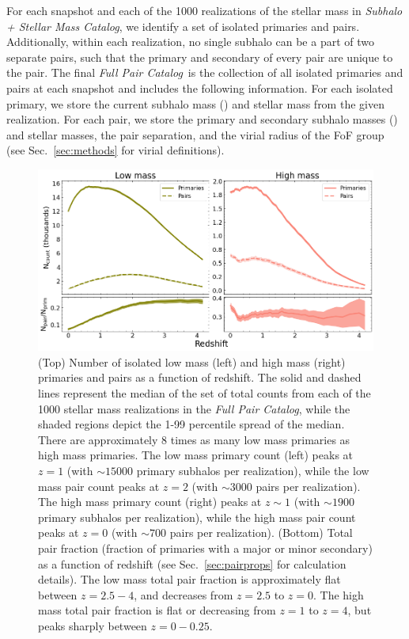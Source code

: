 \documentclass[twocolumn]{aastex631}
\newcommand{\starcat}{\textit{Subhalo + Stellar Mass Catalog}}
\newcommand{\paircat}{\textit{Full Pair Catalog}}
\begin{document}
        For each snapshot and each of the 1000 realizations of the stellar mass in \starcat, we identify a set of isolated primaries and pairs. 
        Additionally, within each realization, no single subhalo can be a part of two separate pairs, such that the primary and secondary of every pair are unique to the pair.
        The final \paircat\ is the collection of all isolated primaries and pairs at each snapshot and includes the following information. 
        For each isolated primary, we store the current subhalo mass (\Mhalo) and stellar mass from the given realization. 
        For each pair, we store the primary and secondary subhalo masses (\Mhalo) and stellar masses, the pair separation, and the virial radius of the FoF group (see Sec.~\ref{sec:methods} for virial definitions).
        
\begin{figure}[htb]
    \centering
    \includegraphics[width=\textwidth]{counts_1000.png}
    \caption{(Top) Number of isolated low mass (left) and high mass (right) primaries and pairs as a function of redshift.
    The solid and dashed lines represent the median of the set of total counts from each of the 1000 stellar mass realizations in the \paircat, while the shaded regions depict the 1-99 percentile spread of the median.
    There are approximately 8 times as many low mass primaries as high mass primaries. 
    The low mass primary count (left) peaks at $z=1$ (with $\sim 15000$ primary subhalos per realization), while the low mass pair count peaks at $z=2$ (with $\sim 3000$ pairs per realization). 
    The high mass primary count (right) peaks at $z\sim1$ (with $\sim 1900$ primary subhalos per realization), while the high mass pair count peaks at $z=0$ (with $\sim 700$ pairs per realization). 
    (Bottom) Total pair fraction (fraction of primaries with a major or minor secondary) as a function of redshift (see Sec.~\ref{sec:pairprops} for calculation details).
    The low mass total pair fraction is approximately flat between $z=2.5-4$, and decreases from $z=2.5$ to $z=0$. 
    The high mass total pair fraction is flat or decreasing from $z=1$ to $z=4$, but peaks sharply between $z=0-0.25$.}
    \label{fig:counts}
\end{figure}
\end{document}
